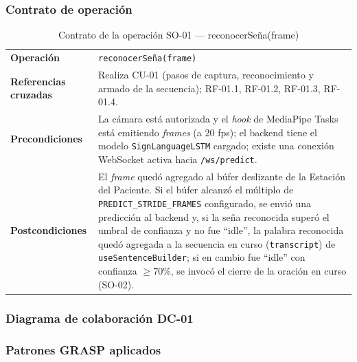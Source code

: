 \subsubsection{Contrato de operación}

\begin{table}[H]
\centering
\begin{tabularx}{\textwidth}{@{}p{4.4cm} X@{}}
\toprule
\textbf{Operación} & \texttt{reconocerSeña(frame)} \\
\textbf{Referencias cruzadas} & Realiza CU-01 (pasos de captura, reconocimiento
y armado de la secuencia); RF-01.1, RF-01.2, RF-01.3, RF-01.4. \\
\textbf{Precondiciones} & La cámara está autorizada y el \textit{hook} de
MediaPipe Tasks está emitiendo \textit{frames} (a 20 fps); el backend tiene el modelo
\texttt{SignLanguageLSTM} cargado; existe una conexión WebSocket activa hacia
\texttt{/ws/predict}. \\
\textbf{Postcondiciones} & El \textit{frame} quedó agregado al búfer
deslizante de la Estación del Paciente. Si el búfer alcanzó el múltiplo de
\texttt{PREDICT\_STRIDE\_FRAMES} configurado, se envió una predicción al
backend y, si la seña reconocida superó el umbral de confianza y no fue
``idle'', la palabra reconocida quedó agregada a la secuencia en curso
(\texttt{transcript}) de \texttt{useSentenceBuilder}; si en cambio fue
``idle'' con confianza $\geq$70\%, se invocó el cierre de la oración en
curso (SO-02). \\
\bottomrule
\end{tabularx}
\caption{Contrato de la operación SO-01 --- reconocerSeña(frame)}
\label{tab:col-contrato-so01}
\end{table}

\subsubsection{Diagrama de colaboración DC-01}


\subsubsection{Patrones GRASP aplicados}


